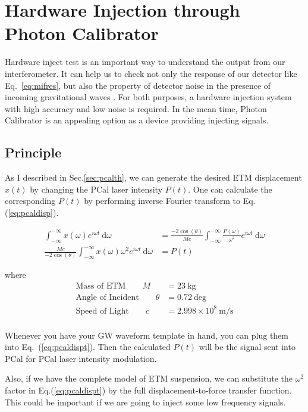 
\chapter{Hardware Injection through Photon Calibrator}

Hardware inject test is an important way to understand the output from our interferometer. It can help us to check not only the response of our detector like Eq.~\ref{eq:mifres}, but also the property of detector noise in the presence of incoming gravitational waves \cite{ligo:inj}. For both purposes, a hardware injection system with high accuracy and low noise is required. In the mean time, Photon Calibrator is an appealing option as a device providing injecting signals. 

\section{Principle}
 As I described in Sec.\ref{sec:pcalth}, we can generate the desired ETM displacement $x(t)$ by changing the PCal laser intensity $P(t)$. One can calculate the corresponding $P(t)$ by performing inverse Fourier transform to Eq.(\ref{eq:pcaldisp}).
 
\begin{align}
    \int_{-\infty}^{-\infty} x(\omega) e^{i \omega t} ~\mathrm{d} \omega &= 
     \frac{-2   \cos(\theta)}{Mc} 
     \int_{-\infty}^{-\infty}\frac{P(\omega)}{\omega^2} e^{i \omega t} ~\mathrm{d} \omega \\
\label{eq:pcaldispt}
    \frac{Mc}{-2 \cos(\theta)} \int_{-\infty}^{-\infty}
     x(\omega) \omega^2 e^{i \omega t} ~\mathrm{d} \omega 
&= P(t) 
\end{align}

where
\begin{align*}
   \text{Mass of ETM} \qquad  M &= 23 ~\mathrm{kg} \\
   \text{Angle of Incident} \qquad   \theta &= 0.72 ~\mathrm{deg}  \\
   \text{Speed of Light} \qquad   c &= 2.998\times10^8 ~\mathrm{m/s} \\
\end{align*}

Whenever you have your GW waveform template in hand, you can plug them into Eq.~(\ref{eq:pcaldispt}). Then the calculated $P(t)$ will be the signal sent into PCal for PCal laser intensity modulation.

Also, if we have the complete model of ETM suspension, we can substitute the $\omega^2$ factor in Eq.(\ref{eq:pcaldispt}) by the full displacement-to-force transfer function. This could be important if we are going to inject some low frequency signals.


